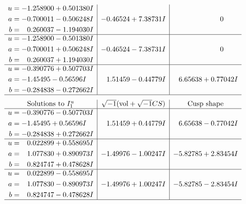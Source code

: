 \documentclass[1p]{elsarticle_modified}
\theoremstyle{definition}
\newcommand{\I}{\sqrt{-1}}
\begin{document}
$$\begin{array}{c|c|c}
\begin{aligned}
u &= -1.258900 + 0.501380 I \\
a &= -0.700011 - 0.506248 I \\
b &= \phantom{-}0.260037 - 1.194030 I\end{aligned}
 & -0.46524 + 7.38731 I & \phantom{-0.000000 } 0 \\ \hline\begin{aligned}
u &= -1.258900 - 0.501380 I \\
a &= -0.700011 + 0.506248 I \\
b &= \phantom{-}0.260037 + 1.194030 I\end{aligned}
 & -0.46524 - 7.38731 I & \phantom{-0.000000 } 0 \\ \hline\begin{aligned}
u &= -0.390776 + 0.507703 I \\
a &= -1.45495 - 0.56596 I \\
b &= -0.284838 - 0.272662 I\end{aligned}
 & \phantom{-}1.51459 - 0.44779 I & \phantom{-}6.65638 + 0.77042 I\\
 \hline 
 \end{array}$$\newpage$$\begin{array}{c|c|c}  
\text{Solutions to }I^u_{1}& \I (\text{vol} + \sqrt{-1}CS) & \text{Cusp shape}\\
 \hline 
\begin{aligned}
u &= -0.390776 - 0.507703 I \\
a &= -1.45495 + 0.56596 I \\
b &= -0.284838 + 0.272662 I\end{aligned}
 & \phantom{-}1.51459 + 0.44779 I & \phantom{-}6.65638 - 0.77042 I \\ \hline\begin{aligned}
u &= \phantom{-}0.022899 + 0.558695 I \\
a &= \phantom{-}1.077830 + 0.890973 I \\
b &= \phantom{-}0.824747 + 0.478628 I\end{aligned}
 & -1.49976 - 1.00247 I & -5.82785 + 2.83454 I \\ \hline\begin{aligned}
u &= \phantom{-}0.022899 - 0.558695 I \\
a &= \phantom{-}1.077830 - 0.890973 I \\
b &= \phantom{-}0.824747 - 0.478628 I\end{aligned}
 & -1.49976 + 1.00247 I & -5.82785 - 2.83454 I\\
 \hline 
 \end{array}$$\newpage\newpage\renewcommand{\arraystretch}{1}
\end{document}
